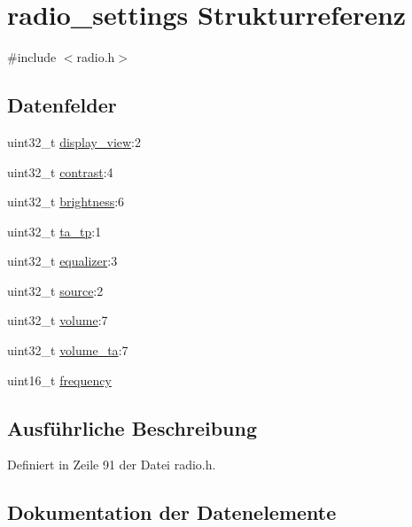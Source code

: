 \hypertarget{structradio__settings}{}\section{radio\+\_\+settings Strukturreferenz}
\label{structradio__settings}


{\ttfamily \#include $<$radio.\+h$>$}

\subsection*{Datenfelder}
\begin{DoxyCompactItemize}
\item 
uint32\+\_\+t \hyperlink{structradio__settings_ab883cb36a9863c8e478492bbf458b132}{display\+\_\+view}\+:2
\item 
uint32\+\_\+t \hyperlink{structradio__settings_a1e8cada2158820574507a1ca0989812d}{contrast}\+:4
\item 
uint32\+\_\+t \hyperlink{structradio__settings_af4cd243fe91e6ef111857d8d7938707f}{brightness}\+:6
\item 
uint32\+\_\+t \hyperlink{structradio__settings_a104f6012667fb7152790a5a6f55c7781}{ta\+\_\+tp}\+:1
\item 
uint32\+\_\+t \hyperlink{structradio__settings_ae8e4d5261bb2829f7dcec9b4b9315424}{equalizer}\+:3
\item 
uint32\+\_\+t \hyperlink{structradio__settings_acced9a05ed6f381d74d67de65d66fa3b}{source}\+:2
\item 
uint32\+\_\+t \hyperlink{structradio__settings_ae2b7935b01cdfe9a81d408dc3f2431f1}{volume}\+:7
\item 
uint32\+\_\+t \hyperlink{structradio__settings_a22b4bf888b705c01b6914d4caaed08dd}{volume\+\_\+ta}\+:7
\item 
uint16\+\_\+t \hyperlink{structradio__settings_aea762e0e67fcafaf5b3cd61201769926}{frequency}
\end{DoxyCompactItemize}


\subsection{Ausführliche Beschreibung}


Definiert in Zeile 91 der Datei radio.\+h.



\subsection{Dokumentation der Datenelemente}
\hypertarget{structradio__settings_af4cd243fe91e6ef111857d8d7938707f}{}
